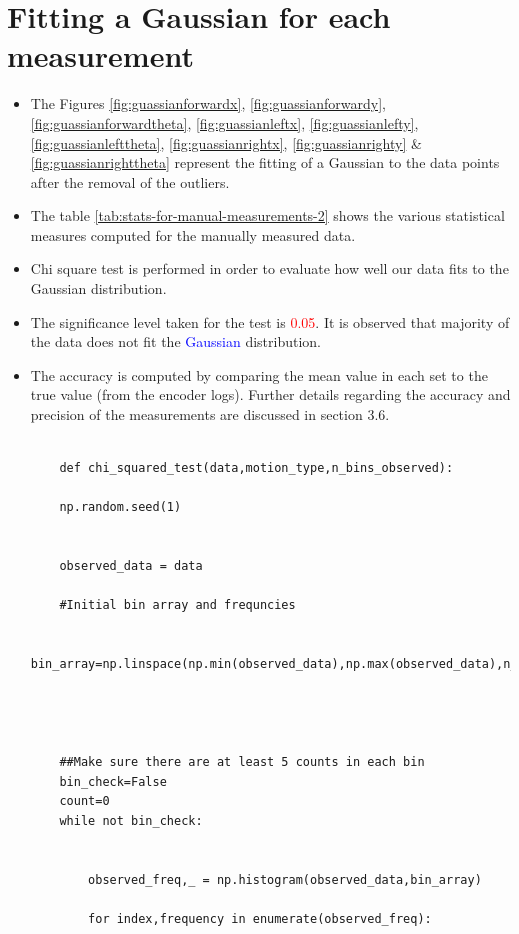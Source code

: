     \section{Fitting a Gaussian for each measurement}
    \begin{itemize}
        \item The Figures \ref{fig:guassianforwardx}, \ref{fig:guassianforwardy}, \ref{fig:guassianforwardtheta}, \ref{fig:guassianleftx}, \ref{fig:guassianlefty}, \ref{fig:guassianlefttheta}, \ref{fig:guassianrightx}, \ref{fig:guassianrighty} \& \ref{fig:guassianrighttheta} represent the fitting of a Gaussian to the data points after the removal of the outliers.
        \item The table \ref{tab:stats-for-manual-measurements-2} shows the various statistical measures computed for the manually measured data.
        \item Chi square test is performed in order to evaluate how well our data fits to the Gaussian distribution.
        \item The significance level taken for the test is \textcolor{red}{0.05}. It is observed that majority of the data does not fit the \textcolor{blue}{Gaussian} distribution.
        \item The accuracy is computed by comparing the mean value in each set to the true value (from the encoder logs). Further details regarding the accuracy and precision of the measurements are discussed in section 3.6.
        
        \begin{verbatim} 
    
    def chi_squared_test(data,motion_type,n_bins_observed):
    
    np.random.seed(1)
     
    
    observed_data = data
    
    #Initial bin array and frequncies
    
    bin_array=np.linspace(np.min(observed_data),np.max(observed_data),n_bins_observed)
    

 
    
    ##Make sure there are at least 5 counts in each bin
    bin_check=False
    count=0
    while not bin_check:  
      
        
        observed_freq,_ = np.histogram(observed_data,bin_array)
        
        for index,frequency in enumerate(observed_freq):
            
            
            

\end{verbatim}
\end{itemize}
